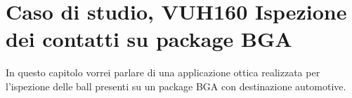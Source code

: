 \chapter{Caso di studio, VUH160 Ispezione dei contatti su package BGA}
In questo capitolo vorrei parlare di una applicazione ottica realizzata per
l'ispezione delle ball presenti su un package BGA con destinazione automotive.

\endinput